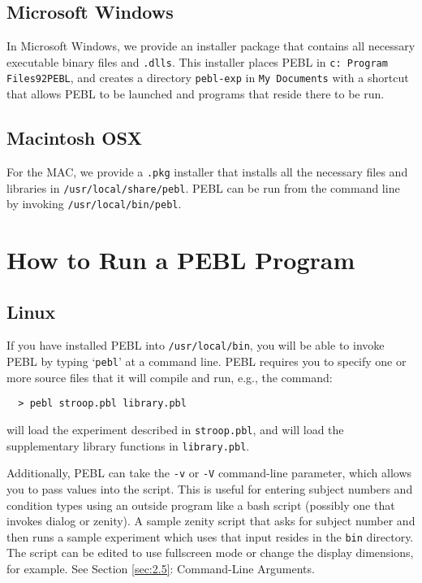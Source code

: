 \subsection{Microsoft Windows}

In Microsoft Windows, we provide an installer package that  contains
all necessary executable binary files and \texttt{.dlls}. This installer places
PEBL in \texttt{c: Program Files\char92PEBL}, and creates a directory \texttt{pebl-exp} in \texttt{My Documents} with a shortcut that allows PEBL to be launched  and  programs that reside there to be run.

\subsection{Macintosh OSX}

For the MAC, we provide a \texttt{.pkg} installer that installs all the
necessary files and libraries in \texttt{/usr/local/share/pebl}.  PEBL can be
run from the command line by invoking \texttt{/usr/local/bin/pebl}.


\section{How to Run a PEBL Program}


\subsection{Linux}

If you have installed PEBL into \texttt{/usr/local/bin}, you will be able to
invoke PEBL by typing `\texttt{pebl}' at a command line.  PEBL requires you to
specify one or more source files that it will compile and run, e.g., the
command:
\begin{verbatim}
  > pebl stroop.pbl library.pbl
\end{verbatim}
will load the experiment described in \texttt{stroop.pbl}, and will load the
supplementary library functions in \texttt{library.pbl}.

Additionally, PEBL can take the \texttt{-v} or \texttt{-V} command-line parameter, which allows you to pass values into the script.  This is useful for
entering subject numbers and condition types using an outside program
like a bash script (possibly one that invokes dialog or zenity). A sample zenity script that asks for subject number and then runs a sample experiment which uses that input resides in the \texttt{bin} directory. The script can be edited to use fullscreen mode or change the display dimensions, for example. See Section \ref{sec:2.5}: Command-Line Arguments.

